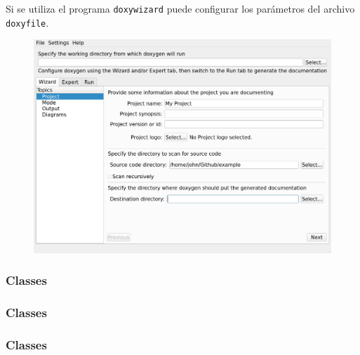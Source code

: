 \begin{frame}
	Si se utiliza el programa \lstinline{doxywizard} puede configurar los parámetros del archivo \lstinline{doxyfile}.

	\begin{figure}[ht!]
	\centering
	\includegraphics[scale=0.2]{wizard_capture.png}
	\end{figure}

\end{frame}

\begin{frame}[fragile]
	\frametitle{Classes}

	


\end{frame}

\begin{frame}[fragile]
	\frametitle{Classes}

	

\end{frame}

\begin{frame}[fragile]
	\frametitle{Classes}

	

\end{frame}

